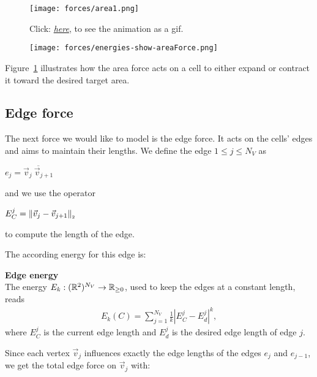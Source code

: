 \begin{figure}
	\begin{center}
		\texttt{[image: forces/area1.png]}
		\caption{Click: \href{https://github.com/tivo476c/FlexibleCellModel/blob/master/figures/gifs/showForces/show-areaForce.gif}{\textit{here}}, to see the animation as a gif. 
		}
		\label{fig:areaForce}
	\end{center}
\end{figure}

\begin{figure}
	\begin{center}
		\texttt{[image: forces/energies-show-areaForce.png]}
		\caption{}
		\label{fig:areaEnergy}
	\end{center}
\end{figure}


Figure~\ref{fig:areaForce} illustrates how the area force acts on a cell to either expand or contract it toward the desired target area.

    
\subsection{Edge force}
The next force we would like to model is the edge force. 
It acts on the cells' edges and aims to maintain their lengths.
We define the edge $1 \leq j \leq N_V$ as 
\begin{center}
	$
	e_j = \overline{\vec{v}_j \: \vec{v}_{j+1}}
	$
\end{center}
and we use the operator 
\begin{center}
	$
	E^j_C = \norm[\vec{v}_j - \vec{v}_{j+1}]
	$
\end{center}
to compute the length of the edge. 

The according energy for this edge is:
\begin{definition} \textbf{Edge energy} \\
	The energy $E_k: (\mathbb{R}^2)^{N_V} \rightarrow \mathbb{R}_{\geq 0}$, used to keep the edges at a constant length, reads 
	\begin{align}
		E_k(C) =  \sum\limits_{j=1}^{N_V} \frac{1}{k} |E^j_{C} - E^{j}_d|^k, \label{eq:edgeEnergy} 
	\end{align}
	where $E^j_{C}$ is the current edge length and $E^{j}_d$ is the desired edge length of edge $j$. 
\end{definition}

Since each vertex $\vec{v}_j$ influences exactly the edge lengths of the edges $e_{j}$ and $e_{j-1}$, we get the total edge force on $\vec{v}_j$ with: 

